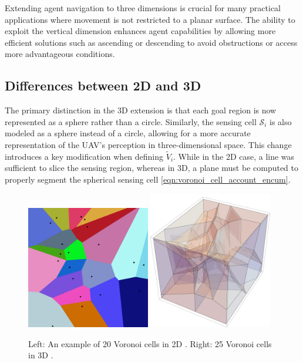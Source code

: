         Extending agent navigation to three dimensions is crucial for many practical applications where movement is not restricted to a planar surface.
        The ability to exploit the vertical dimension enhances agent capabilities by allowing more efficient solutions such as ascending or descending to avoid obstructions or access more advantageous conditions.


    \subsection{Differences between 2D and 3D}
        The primary distinction in the 3D extension is that each goal region is now represented as a sphere rather than a circle.  
        Similarly, the sensing cell $\mathcal{S}_i$ is also modeled as a sphere instead of a circle, allowing for a more accurate representation of the \ac{UAV}'s perception in three-dimensional space.  
        This change introduces a key modification when defining $\tilde{V}_i$.
        While in the 2D case, a line was sufficient to slice the sensing region, whereas in 3D, a plane must be computed to properly segment the spherical sensing cell \eqref{eqn:voronoi_cell_account_encum}. 
        
        \begin{figure}[H]
            \centering
            \includegraphics[width=0.48\textwidth, height=0.48\textwidth]{./fig/diagrams/Euclidean_Voronoi_diagram.jpg}
            \includegraphics[width=0.48\textwidth, height=0.48\textwidth]{./fig/diagrams/Euclidian Voronoi diagram 3d.png}
            \caption{
                Left: An example of 20 Voronoi cells in 2D \cite{Voronoi2d}. Right: 25 Voronoi cells in 3D \cite{Voronoi3d}.
            }
            \label{fig:voronoi_diagrams}
        \end{figure}
    
